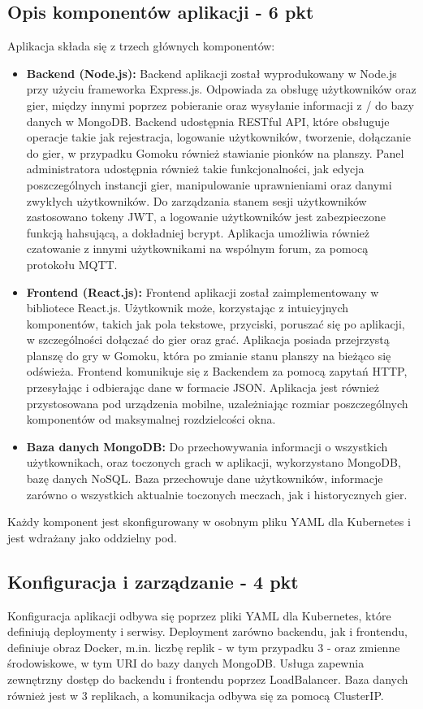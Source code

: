 \documentclass[12pt,a4paper]{article}
\begin{document}
\subsection{Opis komponentów aplikacji - 6 pkt}
\label{sec:FunctionalConditions}
Aplikacja składa się z trzech głównych komponentów:
\begin{itemize}
    \item \textbf{Backend (Node.js):} Backend aplikacji został wyprodukowany w Node.js przy użyciu frameworka Express.js. Odpowiada za obsługę użytkowników oraz gier, między innymi poprzez pobieranie oraz wysyłanie informacji z / do bazy danych w MongoDB. Backend udostępnia RESTful API, które obsługuje operacje takie jak rejestracja, logowanie użytkowników, tworzenie, dołączanie do gier, w przypadku Gomoku również stawianie pionków na planszy. Panel administratora udostępnia również takie funkcjonalności, jak edycja poszczególnych instancji gier, manipulowanie uprawnieniami oraz danymi zwykłych użytkowników. Do zarządzania stanem sesji użytkowników zastosowano tokeny JWT, a logowanie użytkowników jest zabezpieczone funkcją hahsującą, a dokładniej bcrypt. Aplikacja umożliwia również czatowanie z innymi użytkownikami na wspólnym forum, za pomocą protokołu MQTT.

    
    \item \textbf{Frontend (React.js):} Frontend aplikacji został zaimplementowany w bibliotece React.js. Użytkownik może, korzystając z intuicyjnych komponentów, takich jak pola tekstowe, przyciski, poruszać się po aplikacji, w szczególności dołączać do gier oraz grać. Aplikacja posiada przejrzystą planszę do gry w Gomoku, która po zmianie stanu planszy na bieżąco się odświeża. Frontend komunikuje się z Backendem za pomocą zapytań HTTP, przesyłając i odbierając dane w formacie JSON.
    Aplikacja jest również przystosowana pod urządzenia mobilne, uzależniając rozmiar poszczególnych komponentów od maksymalnej rozdzielcości okna.
    \item \textbf{Baza danych MongoDB:} Do przechowywania informacji o wszystkich użytkownikach, oraz toczonych grach w aplikacji, wykorzystano MongoDB, bazę danych NoSQL. Baza przechowuje dane użytkowników, informacje zarówno o wszystkich aktualnie toczonych meczach, jak i historycznych gier.
\end{itemize}
Każdy komponent jest skonfigurowany w osobnym pliku YAML dla Kubernetes i jest wdrażany jako oddzielny pod.

\subsection{Konfiguracja i zarządzanie - 4 pkt}
\label{sec:NonFunctionalConditions}
Konfiguracja aplikacji odbywa się poprzez pliki YAML dla Kubernetes, które definiują deploymenty i serwisy. Deployment zarówno backendu, jak i frontendu, definiuje obraz Docker, m.in. liczbę replik - w tym przypadku 3 - oraz zmienne środowiskowe, w tym URI do bazy danych MongoDB. Usługa zapewnia zewnętrzny dostęp do backendu i frontendu poprzez LoadBalancer. Baza danych również jest w 3 replikach, a komunikacja odbywa się za pomocą ClusterIP.
\end{document}
